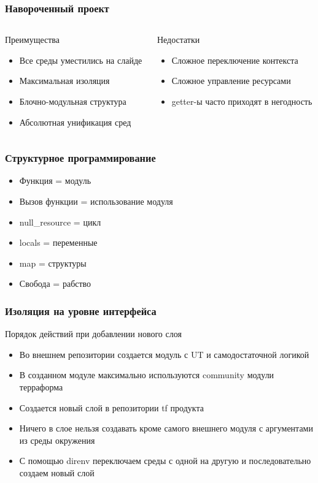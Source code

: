 \documentclass[mathserif,serif]{beamer}
\begin{document}
\begin{frame}
	\frametitle{Навороченный проект}
	\begin{columns}[T]
		\begin{column}{.5\linewidth}
			\begin{minipage}[c][\textheight][c]{\linewidth}
          			Преимущества
				\begin{itemize}
					\item{Все среды уместились на слайде}
					\item{Максимальная изоляция}
					\item{Блочно-модульная структура}
					\item{Абсолютная унификация сред}
				\end{itemize}
			\end{minipage}
		\end{column}
		\begin{column}{.5\linewidth}
			\begin{minipage}[c][\textheight][c]{\linewidth}
          			Недостатки
				\begin{itemize}
					\item{Сложное переключение контекста}
					\item{Сложное управление ресурсами}
					\item{getter-ы часто приходят в негодность}
				\end{itemize}
			\end{minipage}
		\end{column}
	\end{columns}
\end{frame}

\begin{frame}
	\frametitle{Структурное программирование}
	\begin{itemize}
		\item{Функция = модуль}
		\item{Вызов функции = использование модуля}
		\item{null\_resource = цикл}
		\item{locals = переменные}
		\item{map = структуры}
		\item{Свобода = рабство}
	\end{itemize}
\end{frame}

\begin{frame}
	\frametitle{Изоляция на уровне интерфейса}
	Порядок действий при добавлении нового слоя
	\begin{itemize}
		\item{Во внешнем репозитории создается модуль с UT и самодостаточной логикой}
		\item{В созданном модуле максимально используются community модули терраформа}
		\item{Создается новый слой в репозитории tf продукта}
		\item{Ничего в слое нельзя создавать кроме самого внешнего модуля с аргументами из среды окружения}
		\item{С помощью direnv переключаем среды с одной на другую и последовательно создаем новый слой}
	\end{itemize}
\end{frame}
\end{document}

